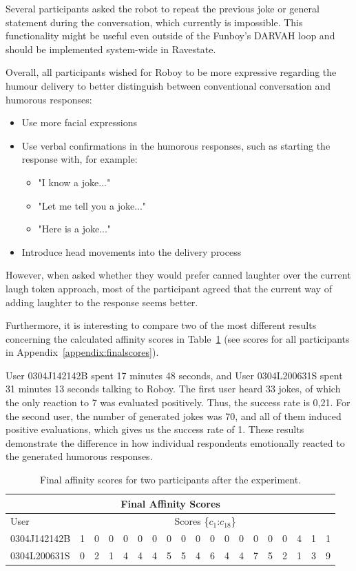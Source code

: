 Several participants asked the robot to repeat the previous joke or general statement during the conversation, which currently is impossible. This functionality might be useful even outside of the Funboy's DARVAH loop and should be implemented system-wide in Ravestate.

Overall, all participants wished for Roboy to be more expressive regarding the humour delivery to better distinguish between conventional conversation and humorous responses:
\begin{itemize}
    \item Use more facial expressions
    \item Use verbal confirmations in the humorous responses, such as starting the response with, for example:
    \begin{itemize}
        \item "I know a joke..."
        \item "Let me tell you a joke..."
        \item "Here is a joke..."
    \end{itemize}
    \item Introduce head movements into the delivery process
\end{itemize}

However, when asked whether they would prefer canned laughter over the current laugh token approach, most of the participant agreed that the current way of adding laughter to the response seems better.

Furthermore, it is interesting to compare two of the most different results concerning the calculated affinity scores in Table~\ref{table:er1} (see scores for all participants in Appendix~\ref{appendix:finalscores}).

User 0304J142142B spent 17 minutes 48 seconds, and User 0304L200631S spent 31 minutes 13 seconds talking to Roboy.
The first user heard 33 jokes, of which the only reaction to 7 was evaluated positively. Thus, the success rate is 0,21. For the second user, the number of generated jokes was 70, and all of them induced positive evaluations, which gives us the success rate of 1. These results demonstrate the difference in how individual respondents emotionally reacted to the generated humorous responses.

\begin{table}[htpb]
\centering
\begin{tabular}{|l|l|l|l|l|l|l|l|l|l|l|l|l|l|l|l|l|l|l|}
\hline
\multicolumn{19}{|c|}{Final Affinity Scores}                                         \\ \hline
User & \multicolumn{18}{c|}{Scores \{\(c_1\):\(c_{18}\)\}}                           \\ \hline
0304J142142B & 1 & 0 & 0 & 0 & 0 & 0 & 0 & 0 & 0 & 0 & 0 & 0 & 0 & 0 & 0 & 4 & 1 & 1 \\ \hline
0304L200631S & 0 & 2 & 1 & 4 & 4 & 4 & 5 & 5 & 4 & 6 & 4 & 4 & 7 & 5 & 2 & 1 & 3 & 9 \\ \hline
\end{tabular}
\caption{Final affinity scores for two participants after the experiment.}
\label{table:er1}
\end{table}

